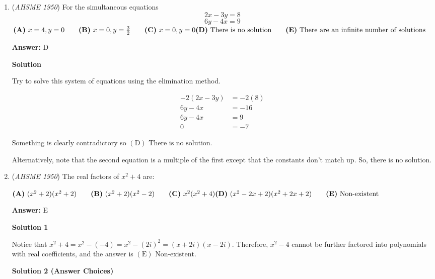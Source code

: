 \begin{enumerate}
 \textbf{Answer: }D



\textbf{Solution}

Factor $x^2-3x+2$ to get $(x-2)(x-1).$ The roots are $\boxed{\mathrm{(D)}\ 0,1,2\text{ and }4.}$



	\item (\textit{AHSME 1950}) For the simultaneous equations 
 \[2x-3y=8\]
 \[6y-4x=9\]
$\textbf{(A)}\ x=4,y=0\qquad\textbf{(B)}\ x=0,y=\frac{3}{2}\qquad\textbf{(C)}\ x=0,y=0\qquad\\ \textbf{(D)}\ \text{There is no solution}\qquad\textbf{(E)}\ \text{There are an infinite number of solutions}$

 \textbf{Answer: }D



\textbf{Solution}

Try to solve this system of equations using the elimination method.

 
 \begin{align*} -2(2x-3y)&=-2(8)\\ 6y-4x&=-16\\ 6y-4x&=9\\ 0&=-7 \end{align*}


 Something is clearly contradictory so $\boxed{\mathrm{(D)}\text{ There is no solution}.}$

 Alternatively, note that the second equation is a multiple of the first except that the constants don't match up. So, there is no solution.

 


	\item (\textit{AHSME 1950}) The real factors of $x^2+4$ are:


 $\textbf{(A)}\ (x^{2}+2)(x^{2}+2)\qquad\textbf{(B)}\ (x^{2}+2)(x^{2}-2)\qquad\textbf{(C)}\ x^{2}(x^{2}+4)\qquad\\ \textbf{(D)}\ (x^{2}-2x+2)(x^{2}+2x+2)\qquad\textbf{(E)}\ \text{Non-existent}$

 \textbf{Answer: }E



\textbf{Solution 1}

Notice that $x^2 + 4 = x^2 - (-4) = x^2 - (2i)^2 = (x+2i)(x-2i)$. Therefore, $x^2-4$ cannot be further factored into polynomials with real coefficients, and the answer is $\boxed{\mathrm{(E)}\text{ Non-existent.}}$




\textbf{Solution 2 (Answer Choices)}


\end{enumerate}

